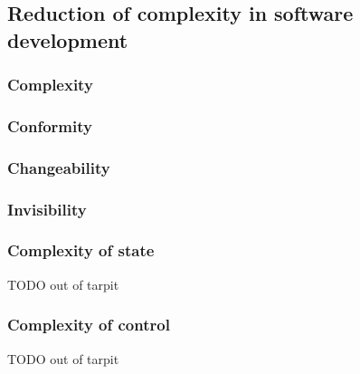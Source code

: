 \subsection{Reduction of complexity in software development}
\subsubsection{Complexity}
\subsubsection{Conformity}
\subsubsection{Changeability}
\subsubsection{Invisibility}
\subsubsection{Complexity of state}
TODO out of tarpit
\subsubsection{Complexity of control}
TODO out of tarpit
